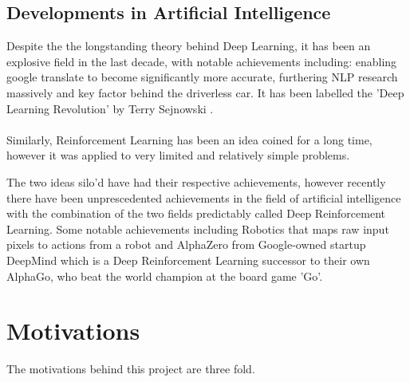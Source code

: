 \documentclass[ %
                    author={Ashwinder Khurana},
                supervisor={Prof Dave Cliff},
                    degree={MEng},
                     title={The Deeply Reinforced Trader},
                  subtitle={},
                      type={enterprise},
                      year={2020} ]{dissertation}
\begin{document}
\subsection{Developments in Artificial Intelligence}
\label{ section:DevelopmentsAI}
Despite the the longstanding theory behind Deep Learning, it has been an explosive field in the last decade, with notable achievements including: enabling google translate to become significantly more accurate, furthering NLP research massively and key factor behind the driverless car. It has been labelled the 'Deep Learning Revolution' by Terry Sejnowski \cite{Deep Learning Revolution}.
\\
\\
Similarly, Reinforcement Learning has been an idea coined for a long time\cite{RL-history}, however it was applied to very limited and relatively simple problems. 

The two ideas silo'd have had their respective achievements, however recently there have been unprescedented achievements in the field of artificial intelligence with the combination of the two fields predictably called Deep Reinforcement Learning. Some notable achievements including Robotics \cite{deep learning robots https://arxiv.org/abs/1504.00702} that maps raw input pixels to actions from a robot and AlphaZero from Google-owned startup DeepMind which is a Deep Reinforcement Learning successor to their own AlphaGo, who beat the world champion at the board game 'Go'. 




\section{Motivations}
 
The motivations behind this project are three fold. 
\vspace{0.5cm}
\end{document}
